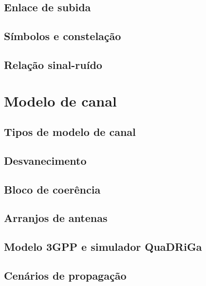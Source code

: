 \subsection{Enlace de subida}
\subsection{Símbolos e constelação}
\subsection{Relação sinal-ruído}

\section{Modelo de canal}\label{sec:modelo-canal}

\subsection{Tipos de modelo de canal}
\subsection{Desvanecimento}
\subsection{Bloco de coerência}\label{subsec:bloco-coerencia}
\subsection{Arranjos de antenas}
\subsection{Modelo 3GPP e simulador QuaDRiGa}
\subsection{Cenários de propagação}

